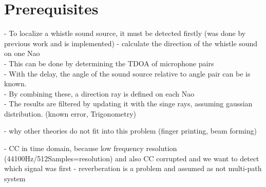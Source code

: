 \chapter{Prerequisites}

- To localize a whistle sound source, it must be detected firstly (was done by previous work
and is implemented)
- calculate the direction of the whistle sound on one Nao\\
- This can be done by determining the \ac{TDOA} of microphone pairs\\
- With the delay, the angle of the sound source relative to angle pair
can be is known.\\
- By combining these, a direction ray is defined on each Nao\\
- The results are filtered by updating it with the singe rays, assuming
gaussian distribution. (known error, Trigonometry)

- why other theories do not fit into this problem
(finger printing, beam forming)

- CC in time domain, because low frequency resolution (44100Hz/512Samples=resolution)
and also \ac{CC} corrupted and we want to detect which signal was first
- reverberation is a problem and assumed as not multi-path system







%
%

%
